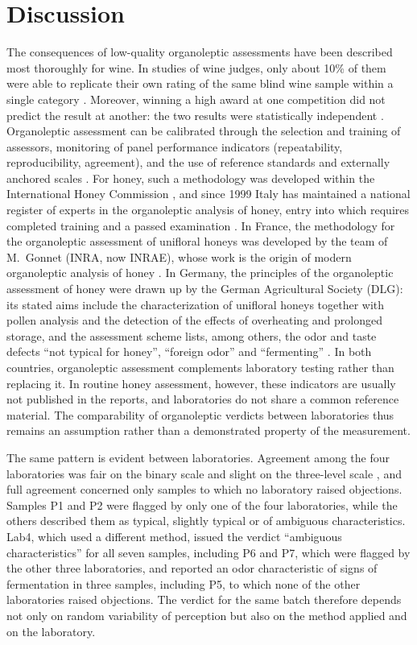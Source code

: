 \section{Discussion}

The consequences of low-quality organoleptic assessments have been described
most thoroughly for wine. In studies of wine judges, only about 10\% of them
were able to replicate their own rating of the same blind wine sample within
a single category \cite{hodgson2008judge}. Moreover, winning a high award at
one competition did not predict the result at another: the two results were
statistically independent \cite{hodgson2009concordance}. Organoleptic
assessment can be calibrated through the selection and training of assessors,
monitoring of panel performance indicators (repeatability, reproducibility,
agreement), and the use of reference standards and externally anchored scales
\cite{sipos2021panel,bartoshuk2004valid}. For honey, such a methodology was
developed within the International Honey Commission \cite{Piana2004}, and
since 1999 Italy has maintained a national register of experts in the
organoleptic analysis of honey, entry into which requires completed training
and a passed examination \cite{AlboMiele1999}. In France, the methodology for
the organoleptic assessment of unifloral honeys was developed by the team of
M.~Gonnet (INRA, now INRAE), whose work is the origin of modern organoleptic
analysis of honey \cite{Piana2004}. In Germany, the principles of the
organoleptic assessment of honey were drawn up by the German Agricultural
Society (DLG): its stated aims include the characterization of unifloral
honeys together with pollen analysis and the detection of the effects of
overheating and prolonged storage, and the assessment scheme lists, among
others, the odor and taste defects ``not typical for honey'', ``foreign
odor'' and ``fermenting'' \cite{DLG2015}. In both countries, organoleptic
assessment complements laboratory testing rather than replacing it. In routine
honey assessment, however, these indicators are usually not published in the
reports, and laboratories do not share a common reference material. The
comparability of organoleptic verdicts between laboratories thus remains an
assumption rather than a demonstrated property of the measurement.

The same pattern is evident between laboratories. Agreement among the four
laboratories was fair on the binary scale and slight on the three-level scale
\cite{LandisKoch1977}, and full agreement concerned only samples to which no
laboratory raised objections. Samples P1 and P2 were flagged by only one of
the four laboratories, while the others described them as typical, slightly
typical or of ambiguous characteristics. Lab4, which used a different method,
issued the verdict ``ambiguous characteristics'' for all seven samples,
including P6 and P7, which were flagged by the other three laboratories, and
reported an odor characteristic of signs of fermentation in three samples,
including P5, to which none of the other laboratories raised objections. The
verdict for the same batch therefore depends not only on random variability of
perception but also on the method applied and on the laboratory.

